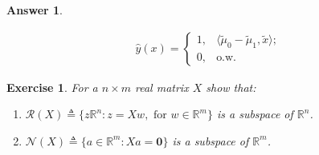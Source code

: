 \documentclass[12pt]{article}
\theoremstyle{colon}
\newtheorem{exercise}{Exercise}
\newtheorem*{answer}{Answer}
\begin{document}
\begin{answer}
\begin{enumerate}[label=\alph*)]
      \begin{gather*}
        \hat{y}(x) = \begin{cases} 
          1, & \langle \tilde{\mu}_0 - \tilde{\mu}_1, \tilde{x} \rangle; \\
          0, & \text{o.w.}
        \end{cases}
      \end{gather*}

  \end{enumerate}
\end{answer}

\clearpage

\begin{exercise}
  For a $n \times m$ real matrix $X$ show that:

  \begin{enumerate}[label=\alph*)]
    \item $\mathcal{R}(X) \triangleq \{ z \mathbb{R}^n: z = Xw, \text{ for } w \in \mathbb{R}^m \}$ is a subspace of $\mathbb{R}^n$.

    \item $\mathcal{N}(X) \triangleq \{ a \in \mathbb{R}^m: Xa = \bm{0} \}$ is a subspace of $\mathbb{R}^m$.
  \end{enumerate}
\end{exercise}
\end{document}

